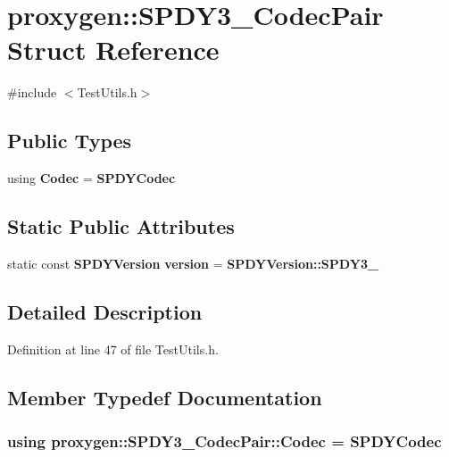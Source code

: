 \section{proxygen\+:\+:S\+P\+D\+Y3\+\_\+Codec\+Pair Struct Reference}
\label{structproxygen_1_1SPDY3__1CodecPair}


{\ttfamily \#include $<$Test\+Utils.\+h$>$}

\subsection*{Public Types}
\begin{DoxyCompactItemize}
\item 
using {\bf Codec} = {\bf S\+P\+D\+Y\+Codec}
\end{DoxyCompactItemize}
\subsection*{Static Public Attributes}
\begin{DoxyCompactItemize}
\item 
static const {\bf S\+P\+D\+Y\+Version} {\bf version} = {\bf S\+P\+D\+Y\+Version\+::\+S\+P\+D\+Y3\+\_}
\end{DoxyCompactItemize}


\subsection{Detailed Description}


Definition at line 47 of file Test\+Utils.\+h.



\subsection{Member Typedef Documentation}
\subsubsection[{Codec}]{\setlength{\rightskip}{0pt plus 5cm}using {\bf proxygen\+::\+S\+P\+D\+Y3\+\_\+Codec\+Pair\+::\+Codec} =  {\bf S\+P\+D\+Y\+Codec}}\label{structproxygen_1_1SPDY3__1CodecPair_add943bba02b9d62592bee30d24d78811}


